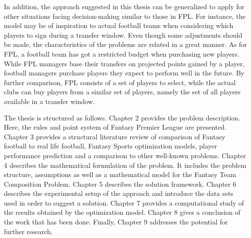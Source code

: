 \newpar

In addition, the approach suggested in this thesis can be generalized to apply for other situations facing decision-making similar to those in FPL. For instance, the model may be of inspiration to actual football teams when considering which players to sign during a transfer window. Even though some adjustments should be made, the characteristics of the problems are related in a great manner. As for FPL, a football team has got a restricted budget when purchasing new players. While FPL managers base their transfers on projected points gained by a player, football managers purchase players they expect to perform well in the future. By further comparison, FPL consists of a set of players to select, while the actual clubs can buy players from a similar set of players, namely the set of all players available in a transfer window.

\newpar

The thesis is structured as follows. Chapter 2 provides the problem description. Here, the rules and point system of Fantasy Premier League are presented. Chapter 3 provides a structural literature review of comparison of Fantasy football to real life football, Fantasy Sports optimization models, player performance prediction and a comparison to other well-known problems. Chapter 4 describes the mathematical formulation of the problem. It includes the problem structure, assumptions as well as a mathematical model for the Fantasy Team Composition Problem. Chapter 5 describes the solution framework. Chapter 6 describes the experimental setup of the approach and introduce the data sets used in order to suggest a solution. Chapter 7 provides a computational study of the results obtained by the optimization model. Chapter 8 gives a conclusion of the work that has been done. Finally, Chapter 9 addresses the potential for further research.



